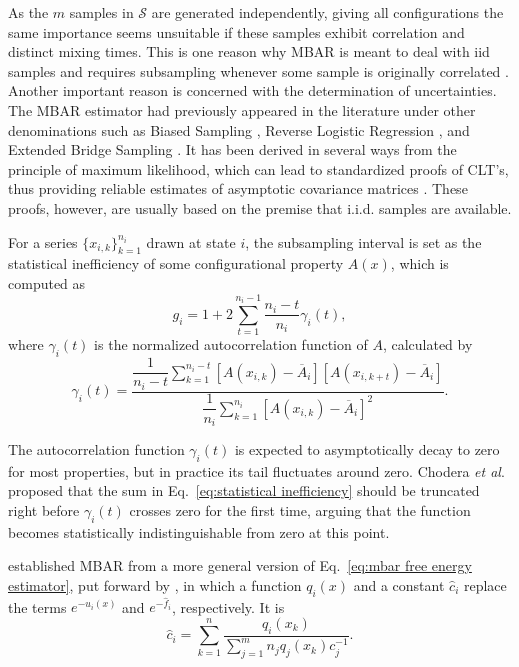 \documentclass[journal=jctcce,manuscript=article,layout=twocolumn]{achemso}
\newcommand{\avg}[1]{\overline{#1}}             %
\begin{document}
As the $m$ samples in $\mathcal S$ are generated independently, giving all configurations the same importance seems unsuitable if these samples exhibit correlation and distinct mixing times. This is one reason why MBAR is meant to deal with iid samples and requires subsampling whenever some sample is originally correlated \cite{Shirts_2008}. Another important reason is concerned with the determination of uncertainties. The MBAR estimator had previously appeared in the literature under other denominations such as Biased Sampling \cite{Vardi_1985, Gill_1988}, Reverse Logistic Regression \cite{Geyer_1994}, and Extended Bridge Sampling \cite{Meng_1996, Kong_2003, Tan_2004}. It has been derived in several ways from the principle of maximum likelihood, which can lead to standardized proofs of CLT's, thus providing reliable estimates of asymptotic covariance matrices \cite{Pawitan_2001, Greene_2012}. These proofs, however, are usually based on the premise that i.i.d. samples are available.

For a series $\{x_{i,k}\}_{k=1}^{n_i}$ drawn at state $i$, the subsampling interval is set as the statistical inefficiency of some configurational property $A(x)$, which is computed as\cite{Chodera_2007}
\begin{equation}
\label{eq:statistical inefficiency}
g_i = 1 + 2 \sum\limits_{t=1}^{n_i-1} \frac{n_i - t}{n_i} \gamma_i(t),
\end{equation}
where $\gamma_i(t)$ is the normalized autocorrelation function of $A$, calculated by
\begin{equation*}
\gamma_i(t) = \frac{\dfrac{1}{n_i - t} \sum\limits_{k=1}^{n_i-t} \left[A(x_{i,k}) - \avg A_i\right]\left[A(x_{i,k+t}) - \avg A_i\right]}{\dfrac{1}{n_i} \sum\limits_{k=1}^{n_i} \left[A(x_{i,k}) - \avg A_i\right]^2}.
\end{equation*}

The autocorrelation function $\gamma_i(t)$ is expected to asymptotically decay to zero for most properties, but in practice its tail fluctuates around zero. Chodera \textit{et al}.\cite{Chodera_2007} proposed that the sum in Eq.~\eqref{eq:statistical inefficiency} should be truncated right before $\gamma_i(t)$ crosses zero for the first time, arguing that the function becomes statistically indistinguishable from zero at this point.

\citeauthor{Shirts_2008} \cite{Shirts_2008} established MBAR from a more general version of Eq.~\eqref{eq:mbar free energy estimator}, put forward by \citeauthor{Kong_2003} \cite{Kong_2003}, in which a function $q_i(x)$ and a constant $\hat c_i$ replace the terms $e^{-u_i(x)}$ and $e^{-\hat f_i}$, respectively. It is
\begin{equation}
\label{eq:mbar general estimator}
{\hat c}_i = \sum_{k=1}^n \frac{q_i(x_k)}{\sum_{j=1}^m n_j q_j(x_k) c_j^{-1}}.
\end{equation}
\end{document}
